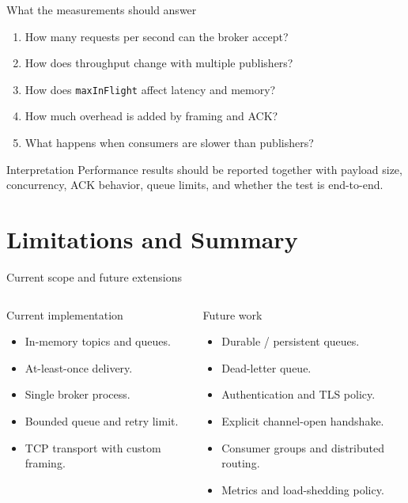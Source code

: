 \documentclass[aspectratio=169,10pt]{beamer}
\newcommand{\code}[1]{\texttt{\small #1}}
\begin{document}
\begin{frame}{What the measurements should answer}
  \begin{enumerate}
    \item How many requests per second can the broker accept?
    \item How does throughput change with multiple publishers?
    \item How does \code{maxInFlight} affect latency and memory?
    \item How much overhead is added by framing and ACK?
    \item What happens when consumers are slower than publishers?
  \end{enumerate}
  \vspace{.5em}
  \begin{block}{Interpretation}
    Performance results should be reported together with payload size,
    concurrency, ACK behavior, queue limits, and whether the test is end-to-end.
  \end{block}
\end{frame}

\section{Limitations and Summary}

\begin{frame}{Current scope and future extensions}
  \begin{columns}[T,onlytextwidth]
      \begin{block}{Current implementation}
        \begin{itemize}
          \item In-memory topics and queues.
          \item At-least-once delivery.
          \item Single broker process.
          \item Bounded queue and retry limit.
          \item TCP transport with custom framing.
        \end{itemize}
      \end{block}
      \begin{block}{Future work}
        \begin{itemize}
          \item Durable / persistent queues.
          \item Dead-letter queue.
          \item Authentication and TLS policy.
          \item Explicit channel-open handshake.
          \item Consumer groups and distributed routing.
          \item Metrics and load-shedding policy.
        \end{itemize}
      \end{block}
  \end{columns}
\end{frame}
\end{document}
